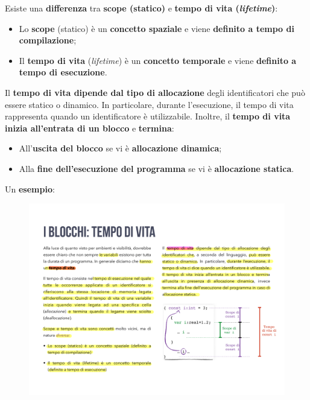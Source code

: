 \documentclass[a4paper]{article}
\begin{document}
 	\noindent
 	Esiste una \textbf{differenza} tra \textbf{scope (statico)} e \textbf{tempo di vita (\emph{lifetime})}:
 	\begin{itemize}
 		\item Lo \textbf{scope} (statico) è un \textbf{concetto spaziale} e viene \textbf{definito a tempo di compilazione};
 		
 		\item Il \textbf{tempo di vita} (\emph{lifetime}) è un \textbf{concetto temporale} e viene \textbf{definito a tempo di esecuzione}.
 	\end{itemize}
 	Il \textbf{tempo di vita dipende dal tipo di allocazione} degli identificatori che può essere statico o dinamico. In particolare, durante l'esecuzione, il tempo di vita rappresenta quando un identificatore è utilizzabile. Inoltre, il \textbf{tempo di vita inizia all'entrata di un blocco} e \textbf{termina}:
 	\begin{itemize}
 		\item All'\textbf{uscita del blocco} se vi è \textbf{allocazione dinamica};
 		\item Alla \textbf{fine dell'esecuzione del programma} se vi è \textbf{allocazione statica}.
 	\end{itemize}
 	Un \textcolor{Green4}{\textbf{esempio}}:
 	\begin{figure}[!htp]
 		\centering
 		\includegraphics[width=\textwidth]{img/esempio-tempo_di_vita.pdf}
 	\end{figure}\newpage
 	
\end{document}
